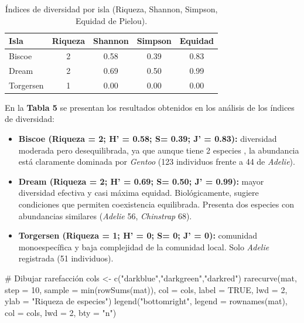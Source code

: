 \documentclass[
  spanish,
  11pt,
  a4paper,
  DIV=11,
  numbers=noendperiod]{scrartcl}
\newenvironment{Shaded}{\begin{snugshade}}{\end{snugshade}}
\newcommand{\AttributeTok}[1]{\textcolor[rgb]{0.40,0.45,0.13}{#1}}
\newcommand{\CommentTok}[1]{\textcolor[rgb]{0.37,0.37,0.37}{#1}}
\newcommand{\ConstantTok}[1]{\textcolor[rgb]{0.56,0.35,0.01}{#1}}
\newcommand{\DecValTok}[1]{\textcolor[rgb]{0.68,0.00,0.00}{#1}}
\newcommand{\FunctionTok}[1]{\textcolor[rgb]{0.28,0.35,0.67}{#1}}
\newcommand{\NormalTok}[1]{\textcolor[rgb]{0.00,0.23,0.31}{#1}}
\newcommand{\OtherTok}[1]{\textcolor[rgb]{0.00,0.23,0.31}{#1}}
\newcommand{\StringTok}[1]{\textcolor[rgb]{0.13,0.47,0.30}{#1}}
\begin{document}
\begin{longtable}[t]{lcccc}
\caption{Índices de diversidad por isla (Riqueza, Shannon, Simpson, Equidad de
Pielou).}\tabularnewline

\toprule
Isla & Riqueza & Shannon & Simpson & Equidad\\
\midrule
Biscoe & 2 & 0.58 & 0.39 & 0.83\\
Dream & 2 & 0.69 & 0.50 & 0.99\\
Torgersen & 1 & 0.00 & 0.00 & 0.00\\
\bottomrule
\end{longtable}

En la \textbf{Tabla 5} se presentan los resultados obtenidos en los
análisis de los índices de diversidad:

\begin{itemize}
\item
  \textbf{Biscoe (Riqueza = 2; H' = 0.58; S= 0.39; J' = 0.83):}
  diversidad moderada pero desequilibrada, ya que aunque tiene 2
  especies , la abundancia está claramente dominada por \emph{Gentoo}
  (123 individuos frente a 44 de \emph{Adelie}).\\
\item
  \textbf{Dream (Riqueza = 2; H' = 0.69; S= 0.50; J' = 0.99):} mayor
  diversidad efectiva y casi máxima equidad. Biológicamente, sugiere
  condiciones que permiten coexistencia equilibrada. Presenta dos
  especies con abundancias similares (\emph{Adelie} 56, \emph{Chinstrap}
  68).\\
\item
  \textbf{Torgersen (Riqueza = 1; H' = 0; S= 0; J' = 0):} comunidad
  monoespecífica y baja complejidad de la comunidad local. Solo
  \emph{Adelie} registrada (51 individuos).
\end{itemize}

\begin{Shaded}
\begin{Highlighting}[numbers=left,,]
\CommentTok{\# Dibujar rarefacción}
\NormalTok{cols }\OtherTok{\textless{}{-}} \FunctionTok{c}\NormalTok{(}\StringTok{"darkblue"}\NormalTok{,}\StringTok{"darkgreen"}\NormalTok{,}\StringTok{"darkred"}\NormalTok{)}
\FunctionTok{rarecurve}\NormalTok{(mat, }\AttributeTok{step =} \DecValTok{10}\NormalTok{, }\AttributeTok{sample =} \FunctionTok{min}\NormalTok{(}\FunctionTok{rowSums}\NormalTok{(mat)), }\AttributeTok{col =}\NormalTok{ cols, }\AttributeTok{label =} \ConstantTok{TRUE}\NormalTok{, }
          \AttributeTok{lwd =} \DecValTok{2}\NormalTok{, }\AttributeTok{ylab =} \StringTok{"Riqueza de especies"}\NormalTok{)}
\FunctionTok{legend}\NormalTok{(}\StringTok{"bottomright"}\NormalTok{, }\AttributeTok{legend =} \FunctionTok{rownames}\NormalTok{(mat), }\AttributeTok{col =}\NormalTok{ cols, }\AttributeTok{lwd =} \DecValTok{2}\NormalTok{, }\AttributeTok{bty =} \StringTok{"n"}\NormalTok{)}
\end{Highlighting}
\end{Shaded}
\end{document}
